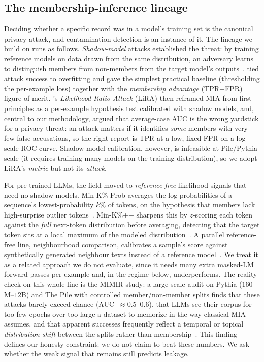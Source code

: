 \subsection{The membership-inference lineage}
\label{sec:mia-lineage}
Deciding whether a specific record was in a model's training set is the canonical
privacy attack, and contamination detection is an instance of it. The lineage we build
on runs as follows. \emph{Shadow-model} attacks established the threat: by training
reference models on data drawn from the same distribution, an adversary learns to
distinguish members from non-members from the target model's
outputs~\citep{shokri2017membership}. \citet{yeom2018privacy} tied attack success to overfitting and
gave the simplest practical baseline (thresholding the per-example loss) together with the
\emph{membership advantage} (TPR${-}$FPR) figure of merit.
\citet{carlini2022lira}'s \emph{Likelihood Ratio Attack} (LiRA) then reframed MIA from first
principles as a per-example hypothesis test calibrated with shadow models, and, central
to our methodology, argued that average-case AUC is the wrong yardstick for a privacy
threat: an attack matters if it identifies \emph{some} members with very few false
accusations, so the right report is TPR at a low, fixed FPR on a log-scale ROC
curve. Shadow-model calibration, however, is infeasible at
Pile/Pythia scale (it requires training many models on the training distribution), so we
adopt LiRA's \emph{metric} but not its \emph{attack}.

For pre-trained LLMs, the field moved to \emph{reference-free} likelihood signals that
need no shadow models. Min-K\% Prob averages the log-probabilities of a sequence's
lowest-probability $k\%$ of tokens, on the hypothesis that members lack
high-surprise outlier tokens~\citep{shi2024detecting}. Min-K\%++ sharpens this by
$z$-scoring each token against the \emph{full} next-token distribution before averaging,
detecting that the target token sits at a local maximum of the modeled
distribution~\citep{zhang2025minkpp}. A parallel reference-free line, neighbourhood
comparison, calibrates a sample's score against synthetically generated neighbour texts
instead of a reference model~\citep{mattern2023neighbourhood}. We treat it as a related
approach we do not evaluate, since it needs many extra masked-LM forward passes per
example and, in the regime below, underperforms. The reality check on this whole line is
the MIMIR study: a large-scale audit on Pythia ($160$M--$12$B) and The Pile with
controlled member/non-member splits finds that these attacks barely exceed chance
(AUC~$\approx 0.5$--$0.6$), that LLMs see their corpus for too few epochs over too large
a dataset to memorize in the way classical MIA assumes, and that apparent successes
frequently reflect a temporal or topical \emph{distribution shift} between the splits
rather than membership~\citep{duan2024mia}. This finding defines our honesty constraint:
we do not claim to beat these numbers. We ask whether the weak signal that remains still
predicts leakage.


